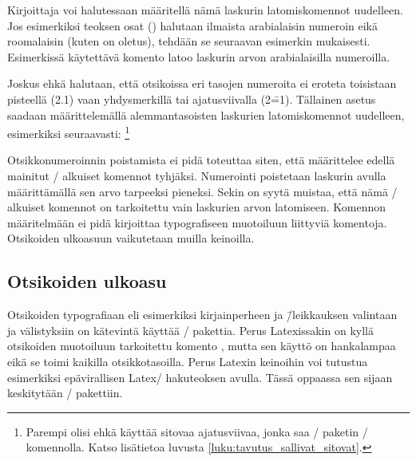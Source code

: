 Kirjoittaja voi halutessaan määritellä nämä laskurin latomiskomennot
uudelleen. Jos esimerkiksi teoksen osat () halutaan
ilmaista arabialaisin numeroin eikä roomalaisin (kuten on oletus),
tehdään se seuraavan esimerkin mukaisesti. Esimerkissä käytettävä
komento  latoo laskurin arvon arabialaisilla numeroilla.

\begin{koodilohkosis}
  \renewcommand{\thepart}{\arabic{part}}
\end{koodilohkosis}

Joskus ehkä halutaan, että otsikoissa eri tasojen numeroita ei eroteta
toisistaan pisteellä (2.1) vaan yhdysmerkillä tai ajatusviivalla
(2\==1). Tällainen asetus saadaan määrittelemällä alemmantasoisten
laskurien latomiskomennot uudelleen, esimerkiksi seuraavasti:%
\footnote{Parempi olisi ehkä käyttää sitovaa ajatusviivaa, jonka saa
  \-/ paketin \komento{==}\-/ komennolla. Katso
  lisätietoa luvusta \ref{luku:tavutus_sallivat_sitovat}.}

\begin{koodilohkosis}
  \renewcommand{\thesubsection}{\thesection--\arabic{subsection}}
  \renewcommand{\thesubsubsection}{%
    \thesubsection--\arabic{subsubsection}}
\end{koodilohkosis}

Otsikkonumeroinnin poistamista ei pidä toteuttaa siten, että määrittelee
edellä mainitut \-/ alkuiset komennot tyhjäksi. Numerointi
poistetaan laskurin  avulla määrittämällä sen arvo
tarpeeksi pieneksi. Sekin on syytä muistaa, että nämä \-/
alkuiset komennot on tarkoitettu vain laskurien arvon latomiseen.
Komennon määritelmään ei pidä kirjoittaa typografiseen muotoiluun
liittyviä komentoja. Otsikoiden ulkoasuun vaikutetaan muilla keinoilla.

\subsection{Otsikoiden ulkoasu}
\label{luku:otsikot_ulkoasu}

Otsikoiden typografiaan eli esimerkiksi kirjainperheen ja \=/leikkauksen
valintaan ja välistyksiin on kätevintä käyttää \-/
pakettia. Perus Latexissakin on kyllä otsikoiden
muotoiluun tarkoitettu komento , mutta sen
käyttö on hankalampaa eikä se toimi kaikilla otsikkotasoilla. Perus
Latexin keinoihin voi tutustua esimerkiksi epävirallisen Latex\-/
hakuteoksen \textcite{unoffref} avulla. Tässä oppaassa sen sijaan
keskitytään \-/ pakettiin.

